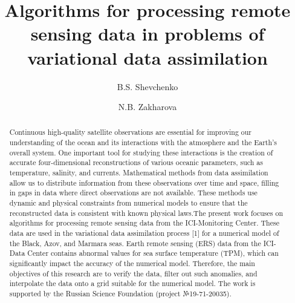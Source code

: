 \begin{englishtitle} %
\title{Algorithms for processing remote sensing data in problems of variational data assimilation}
\author{B.S. Shevchenko  \and  N.B. Zakharova
}

\maketitle

\begin{abstract}
Continuous high-quality satellite observations are essential for improving our understanding of the ocean and its interactions with the atmosphere and the Earth's overall system. One important tool for studying these interactions is the creation of accurate four-dimensional reconstructions of various oceanic parameters, such as temperature, salinity, and currents. Mathematical methods from data assimilation allow us to distribute information from these observations over time and space, filling in gaps in data where direct observations are not available. These methods use dynamic and physical constraints from numerical models to ensure that the reconstructed data is consistent with known physical laws.The present work focuses on algorithms for processing remote sensing data from the ICI-Monitoring Center. These data are used in the variational data assimilation process [1] for a numerical model of the Black, Azov, and Marmara seas. Earth remote sensing (ERS) data from the ICI-Data Center contains abnormal values for sea surface temperature (TPM), which can significantly impact the accuracy of the numerical model. Therefore, the main objectives of this research are to verify the data, filter out such anomalies, and interpolate the data onto a grid suitable for the numerical model.
The work is supported by the Russian Science Foundation (project №19-71-20035).
\end{abstract}
\end{englishtitle}

\iffalse
%
%


